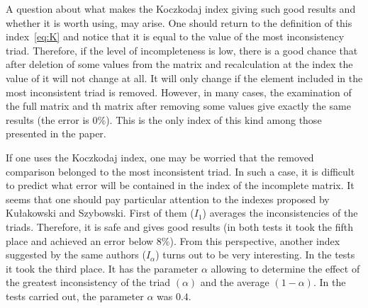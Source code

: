 A question about what makes the Koczkodaj index giving such good results and whether it is worth using, may arise. One should return to the definition of this index~\ref{eq:K} and notice that it is equal to the value of the most inconsistency triad. Therefore, if the level of incompleteness is low, there is a good chance that after deletion of some values from the matrix and recalculation at the index the value of it will not change at all. It will only change if the element included in the most inconsistent triad is removed. However, in many cases, the examination of the full matrix and th matrix after removing some values give exactly the same results (the error is $0\%$). This is the only index of this kind among those presented in the paper.

If one uses the Koczkodaj index, one may be worried that the removed comparison belonged to the most inconsistent triad. In such a case, it is difficult to predict what error will be contained in the index of the incomplete matrix. It seems that one should pay particular attention to the indexes proposed by Kułakowski and Szybowski. First of them ($I_1$) averages the inconsistencies of the triads. Therefore, it is safe and gives good results (in both tests it took the fifth place and achieved an error below $8\%$). From this perspective, another index suggested by the same authors ($I_\alpha$) turns out to be very interesting. In the tests it took the third place. It has the parameter $\alpha$ allowing to determine the effect of the greatest inconsistency of the triad $\left(\alpha\right)$ and the average $\left(1-\alpha\right)$. In the tests carried out, the parameter $\alpha$ was $0.4$.